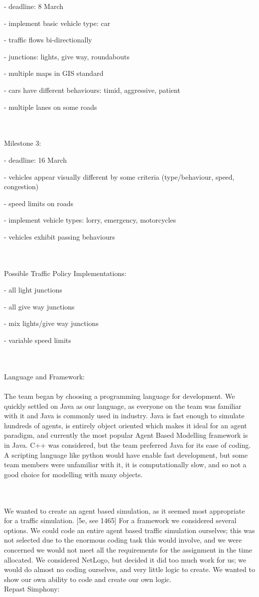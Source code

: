 \documentclass[11pt]{article}
\begin{document}
- deadline: 8 March

- implement basic vehicle type: car

- traffic flows bi-directionally

- junctions: lights, give way, roundabouts

- multiple maps in GIS standard

- cars have different behaviours: timid, aggressive, patient

- multiple lanes on some roads

\\ \\

Milestone 3:

- deadline: 16 March


- vehicles appear visually different by some criteria (type/behaviour, speed, congestion)

- speed limits on roads

- implement vehicle types: lorry, emergency, motorcycles

- vehicles exhibit passing behaviours

\\ \\
Possible Traffic Policy Implementations:

- all light junctions

- all give way junctions

- mix lights/give way junctions

- variable speed limits

\\ \\

Language and Framework:
\\ \\

The team began by choosing a programming language for development. We quickly settled on Java as our language, as everyone on the team was familiar with it and Java is commonly used in industry. Java is fast enough to simulate hundreds of agents, is entirely object oriented which makes it ideal for an agent paradigm, and currently the most popular Agent Based Modelling framework is in Java. C++ was considered, but the team preferred Java for its ease of coding. A scripting language like python would have enable fast development, but some team members were unfamiliar with it, it is computationally slow, and so not a good choice for modelling with many objects.

\\ \\
We wanted to create an agent based simulation, as it seemed most appropriate for a traffic simulation. [5e, see 1465]
For a framework we considered several options. We could code an entire agent based traffic simulation ourselves; this was not selected due to the enormous coding task this would involve, and we were concerned we would not meet all the requirements for the assignment in the time allocated. We considered NetLogo, but decided it did too much work for us; we would do almost no coding ourselves, and very little logic to create. We wanted to show our own ability to code and create our own logic.
\\
Repast Simphony:
\end{document}
